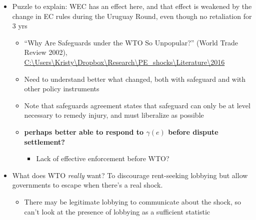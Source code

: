\documentclass[12pt]{article}
\newcommand{\ga}{\gamma}
\begin{document}
\begin{enumerate}
\begin{itemize}
\begin{itemize}
\begin{itemize}
							\item \textbf{Think about how WEC may mitigate LOBBY'S incentives through reaction of gov't}
							\item Ben doesn't have any need for escape; have to put WEC into my framework
							\item Government feels $\ga$ the same whether it's elevated because of $s$ or $e$
							\item What is the neutralizing that happens? Why would the government invoke EC when it knows that WEC is coming anyway? Because it's in another sector where it puts less weight right now?
							\item WEC should work against TOT, not PE shock?
						\end{itemize}
					\item I would find an examination of WEC much more compelling that the approach to punishment that you currently discuss on page 20, whereby two bindings are negotiated.
				\end{itemize}
			\item Puzzle to explain: WEC has an effect here, and that effect is weakened by the change in EC rules during the Uruguay Round, even though no retaliation for 3 yrs
				\begin{itemize}
					\item ``Why Are Safeguards under the WTO So Unpopular?'' (World Trade Review 2002), \url{C:\Users\Kristy\Dropbox\Research\PE_shocks\Literature\2016}
					\item Need to understand better what changed, both with safeguard and with other policy instruments
					\item Note that safeguards agreement states that safeguard can only be at level necessary to remedy injury, and must liberalize as possible
					\item \textbf{perhaps better able to respond to $\ga(e)$ before dispute settlement?}
						\begin{itemize}
							\item Lack of effective enforcement before WTO?
						\end{itemize}
				\end{itemize}
			\item What does WTO \textit{really} want? To discourage rent-seeking lobbying but allow governments to escape when there's a real shock.
				\begin{itemize}
					\item There may be legitimate lobbying to communicate about the shock, so can't look at the presence of lobbying as a sufficient statistic

\end{itemize}
\end{itemize}
\end{enumerate}
\end{document}
